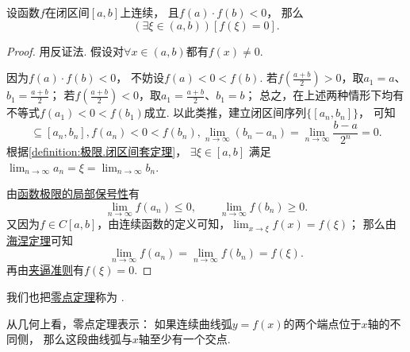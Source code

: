 \begin{theorem}[零点定理]\label{theorem:极限.零点定理}
设函数\(f\)在闭区间\([a,b]\)上连续，
且\(f(a) \cdot f(b)<0\)，
那么\begin{equation*}
	(\exists\xi\in(a,b))[f(\xi) = 0].
\end{equation*}
\begin{proof}
用反证法.
假设对\(\forall x\in(a,b)\)都有\(f(x) \neq 0\).

因为\(f(a) \cdot f(b)<0\)，
不妨设\(f(a) < 0 < f(b)\).
若\(f\left(\frac{a+b}{2}\right)>0\)，取\(a_1=a\)、\(b_1=\frac{a+b}{2}\)；
若\(f\left(\frac{a+b}{2}\right)<0\)，取\(a_1=\frac{a+b}{2}\)、\(b_1=b\)；
总之，在上述两种情形下均有不等式\(f(a_1) < 0 < f(b_1)\)成立.
以此类推，建立闭区间序列\(\{[a_n,b_n]\}\)，
可知\begin{equation*}
	[a_{n+1},b_{n+1}] \subseteq [a_n,b_n],
	f(a_n) < 0 < f(b_n),
	\lim_{n\to\infty} (b_n - a_n)
	= \lim_{n\to\infty} \frac{b-a}{2^n}
	= 0.
\end{equation*}
根据\cref{definition:极限.闭区间套定理}，
\(\exists\xi\in[a,b]\)
满足\(\lim_{n\to\infty} a_n
= \xi
= \lim_{n\to\infty} b_n\).

由\hyperref[theorem:极限.函数极限的局部保号性3]{函数极限的局部保号性}有\begin{equation*}
	\lim_{n\to\infty} f(a_n) \leq 0,
	\qquad
	\lim_{n\to\infty} f(b_n) \geq 0.
\end{equation*}
又因为\(f \in C[a,b]\)，由连续函数的定义可知，\(\lim_{x\to\xi} f(x) = f(\xi)\)；
那么由\hyperref[theorem:极限.海涅定理]{海涅定理}可知\begin{equation*}
	\lim_{n\to\infty} f(a_n)
	= \lim_{n\to\infty} f(b_n)
	= f(\xi).
\end{equation*}
再由\hyperref[theorem:函数极限.夹逼准则]{夹逼准则}有\(f(\xi)=0\).
\end{proof}
\end{theorem}
我们也把\hyperref[theorem:极限.零点定理]{零点定理}称为%
.

从几何上看，零点定理表示：
如果连续曲线弧\(y = f(x)\)的两个端点位于\(x\)轴的不同侧，
那么这段曲线弧与\(x\)轴至少有一个交点.

